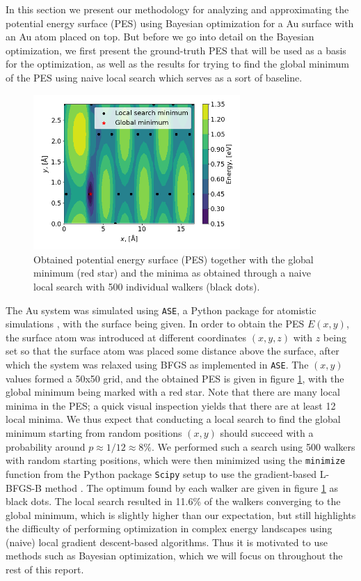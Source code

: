 \documentclass[11pt,a4paper]{article}
\begin{document}
In this section we present our methodology for analyzing and approximating the potential energy surface (PES) using Bayesian optimization for a Au surface with an Au atom placed on top. But before we go into detail on the Bayesian optimization, we first present the ground-truth PES that will be used as a basis for the optimization, as well as the results for trying to find the global minimum of the PES using naive local search which serves as a sort of baseline.


\begin{figure}[ht]
    \centering
    \includegraphics[width=0.7\textwidth]{figures/task12.png}
    \caption{Obtained potential energy surface (PES) together with the global minimum (red star) and the minima as obtained through a naive local search with 500 individual walkers (black dots). }
    \label{fig:pes}
\end{figure}

The Au system was simulated using \texttt{ASE}, a Python package for atomistic simulations \cite{ASE}, with the surface being given. In order to obtain the PES $E(x,y)$, the surface atom was introduced at different coordinates $(x,y,z)$ with $z$ being set so that the surface atom was placed some distance above the surface, after which the system was relaxed using BFGS as implemented in \texttt{ASE}. The $(x,y)$ values formed a 50x50 grid, and the obtained PES is given in figure \ref{fig:pes}, with the global minimum being marked with a red star. Note that there are many local minima in the PES; a quick visual inspection yields that there are at least 12 local minima. We thus expect that conducting a local search to find the global minimum starting from random positions $(x,y)$ should succeed with a probability around $p \approx 1/12 \approx 8\%$. We performed such a search using 500 walkers with random starting positions, which were then minimized using the \texttt{minimize} function from the Python package \texttt{Scipy} setup to use the gradient-based L-BFGS-B method \cite{scipy_min}. The optimum found by each walker are given in figure \ref{fig:pes} as black dots. The local search resulted in 11.6\% of the walkers converging to the global minimum, which is slightly higher than our expectation, but still highlights the difficulty of performing optimization in complex energy landscapes using (naive) local gradient descent-based algorithms. Thus it is motivated to use methods such as Bayesian optimization, which we will focus on throughout the rest of this report. 
\end{document}
